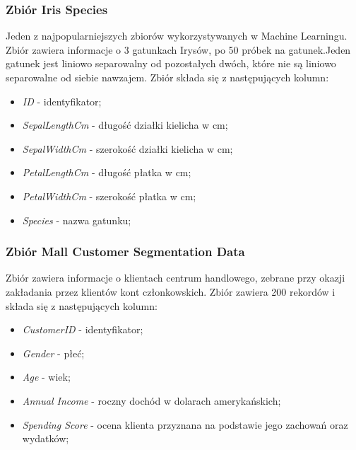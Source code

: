 \documentclass{classrep}
\begin{document}
{{            \subsubsection{Zbiór Iris Species}
            \label{opis_zbiorow_intro_iris} {
                Jeden z najpopularniejszych zbiorów wykorzystywanych w Machine Learningu. Zbiór zawiera informacje o 3 gatunkach Irysów, po 50 próbek na gatunek.Jeden gatunek jest liniowo separowalny od pozostałych dwóch, które nie są liniowo separowalne od siebie nawzajem. Zbiór składa się z następujących kolumn:
                \begin{itemize}
                    \item \textit{ID} - identyfikator;
                    \item \textit{SepalLengthCm} - długość działki kielicha w cm;
                    \item \textit{SepalWidthCm} - szerokość działki kielicha w cm;
                    \item \textit{PetalLengthCm} - długość płatka w cm;
                    \item \textit{PetalWidthCm} - szerokość płatka w cm;
                    \item \textit{Species} - nazwa gatunku;
                \end{itemize}
            }

            \subsubsection{Zbiór Mall Customer Segmentation Data}
            \label{opis_zbiorow_intro_customers} {
                Zbiór zawiera informacje o klientach centrum handlowego, zebrane przy okazji zakładania przez klientów kont członkowskich. Zbiór zawiera 200 rekordów i składa się z następujących kolumn:
                \begin{itemize}
                    \item \textit{CustomerID} - identyfikator;
                    \item \textit{Gender} - płeć;
                    \item \textit{Age} - wiek;
                    \item \textit{Annual Income} - roczny dochód w dolarach amerykańskich;
                    \item \textit{Spending Score} - ocena klienta przyznana na podstawie jego zachowań oraz wydatków;
                \end{itemize}
            }

}}
\end{document}

